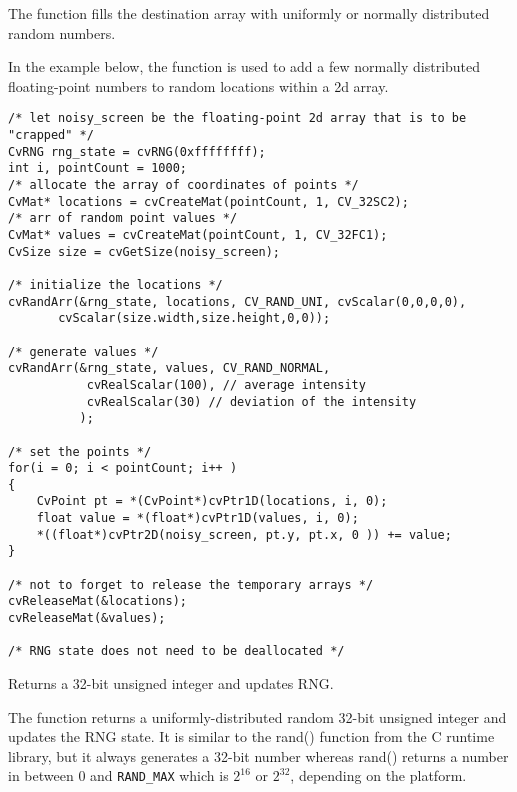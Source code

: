 The function fills the destination array with uniformly
or normally distributed random numbers.

\ifC
In the example below, the function
is used to add a few normally distributed floating-point numbers to
random locations within a 2d array.

\begin{lstlisting}
/* let noisy_screen be the floating-point 2d array that is to be "crapped" */
CvRNG rng_state = cvRNG(0xffffffff);
int i, pointCount = 1000;
/* allocate the array of coordinates of points */
CvMat* locations = cvCreateMat(pointCount, 1, CV_32SC2);
/* arr of random point values */
CvMat* values = cvCreateMat(pointCount, 1, CV_32FC1);
CvSize size = cvGetSize(noisy_screen);

/* initialize the locations */
cvRandArr(&rng_state, locations, CV_RAND_UNI, cvScalar(0,0,0,0), 
	   cvScalar(size.width,size.height,0,0));

/* generate values */
cvRandArr(&rng_state, values, CV_RAND_NORMAL,
           cvRealScalar(100), // average intensity
           cvRealScalar(30) // deviation of the intensity
          );

/* set the points */
for(i = 0; i < pointCount; i++ )
{
    CvPoint pt = *(CvPoint*)cvPtr1D(locations, i, 0);
    float value = *(float*)cvPtr1D(values, i, 0);
    *((float*)cvPtr2D(noisy_screen, pt.y, pt.x, 0 )) += value;
}

/* not to forget to release the temporary arrays */
cvReleaseMat(&locations);
cvReleaseMat(&values);

/* RNG state does not need to be deallocated */
\end{lstlisting}
\fi

Returns a 32-bit unsigned integer and updates RNG.


\begin{description}
\end{description}

The function returns a uniformly-distributed random
32-bit unsigned integer and updates the RNG state. It is similar to the rand()
function from the C runtime library, but it always generates a 32-bit number
whereas rand() returns a number in between 0 and \texttt{RAND\_MAX}
which is $2^{16}$ or $2^{32}$, depending on the platform.

